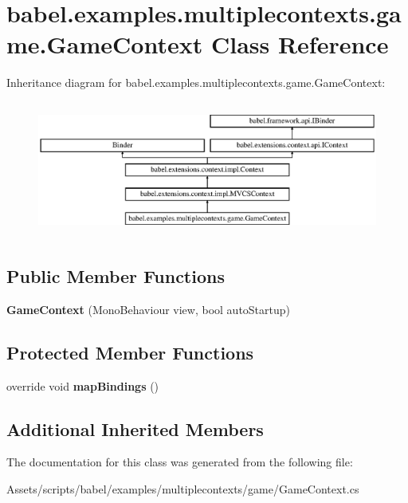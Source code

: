 \hypertarget{classbabel_1_1examples_1_1multiplecontexts_1_1game_1_1_game_context}{\section{babel.\-examples.\-multiplecontexts.\-game.\-Game\-Context Class Reference}
\label{classbabel_1_1examples_1_1multiplecontexts_1_1game_1_1_game_context}
}
Inheritance diagram for babel.\-examples.\-multiplecontexts.\-game.\-Game\-Context\-:\begin{figure}[H]
\begin{center}
\leavevmode
\includegraphics[height=4.501608cm]{classbabel_1_1examples_1_1multiplecontexts_1_1game_1_1_game_context}
\end{center}
\end{figure}
\subsection*{Public Member Functions}
\begin{DoxyCompactItemize}
\item 
\hypertarget{classbabel_1_1examples_1_1multiplecontexts_1_1game_1_1_game_context_a443098d2b9aabdd83b174b9f7e7925d0}{{\bfseries Game\-Context} (Mono\-Behaviour view, bool auto\-Startup)}\label{classbabel_1_1examples_1_1multiplecontexts_1_1game_1_1_game_context_a443098d2b9aabdd83b174b9f7e7925d0}

\end{DoxyCompactItemize}
\subsection*{Protected Member Functions}
\begin{DoxyCompactItemize}
\item 
\hypertarget{classbabel_1_1examples_1_1multiplecontexts_1_1game_1_1_game_context_a0935f6555370557a215330a3cd8d2e81}{override void {\bfseries map\-Bindings} ()}\label{classbabel_1_1examples_1_1multiplecontexts_1_1game_1_1_game_context_a0935f6555370557a215330a3cd8d2e81}

\end{DoxyCompactItemize}
\subsection*{Additional Inherited Members}


The documentation for this class was generated from the following file\-:\begin{DoxyCompactItemize}
\item 
Assets/scripts/babel/examples/multiplecontexts/game/Game\-Context.\-cs\end{DoxyCompactItemize}
